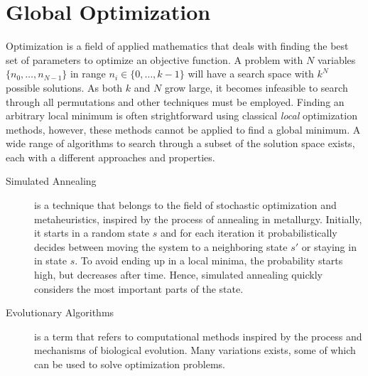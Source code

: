 \section{Global Optimization}

Optimization is a field of applied mathematics that deals with finding the best
set of parameters to optimize an objective function. A problem with $N$
variables $\{n_0, \dots, n_{N-1}\}$ in range $n_i \in \{0, \dots, k-1\}$ will
have a search space with $k^N$ possible solutions. As both $k$ and $N$ grow
large, it becomes infeasible to search through all permutations and other
techniques must be employed. Finding an arbitrary local minimum is often
strightforward using classical \emph{local} optimization methods, however, these
methods cannot be applied to find a global minimum. A wide range of algorithms
to search through a subset of the solution space exists, each with a different
approaches and properties.

\begin{description}
    \item[Simulated Annealing] is a technique that belongs to the field of
        stochastic optimization and metaheuristics, inspired by the process of
        annealing in metallurgy. Initially, it starts in a random state $s$ and
        for each iteration it probabilistically decides between moving the
        system to a neighboring state $s'$ or staying in in state $s$. To avoid
        ending up in a local minima, the probability starts high, but decreases
        after time. Hence, simulated annealing quickly considers the most
        important parts of the state.
    \item[Evolutionary Algorithms] is a term that refers to computational
        methods inspired by the process and mechanisms of biological evolution.
        Many variations exists, some of which can be used to solve optimization
        problems.

\end{description}

